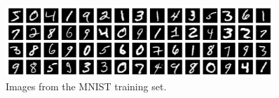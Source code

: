 \begin{figure}[H]
  \centering
  \includegraphics[width=0.9\textwidth]{images/mnist_60_images_4x15_grid.png}
  \caption{Images from the MNIST training set.}
  \label{fig:mnist_images}
\end{figure}




